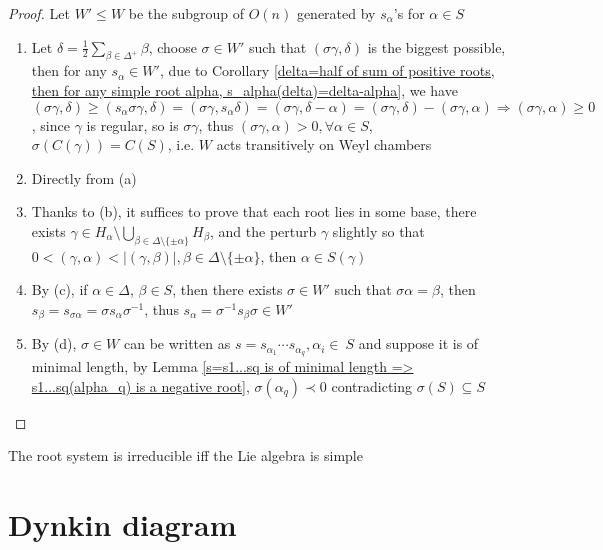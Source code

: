 \documentclass[main]{subfiles}
\begin{document}
\begin{proof}
Let $W'\leq W$ be  the subgroup of $O(n)$ generated by $s_\alpha$'s for $\alpha\in S$
\begin{enumerate}[leftmargin=*,label=\textbf{(\alph*)}]
\item Let $\delta=\displaystyle\frac{1}{2}\sum_{\beta\in\Delta^+}\beta$, choose $\sigma\in W'$ such that $(\sigma\gamma,\delta)$ is the biggest possible, then for any $s_\alpha\in W'$, due to Corollary \ref{delta=half of sum of positive roots, then for any simple root alpha, s_alpha(delta)=delta-alpha}, we have $(\sigma\gamma,\delta)\geq(s_\alpha\sigma\gamma,\delta)=(\sigma\gamma,s_\alpha\delta)=(\sigma\gamma,\delta-\alpha)=(\sigma\gamma,\delta)-(\sigma\gamma,\alpha)\Rightarrow(\sigma\gamma,\alpha)\geq0$, since $\gamma$ is regular, so is $\sigma\gamma$, thus $(\sigma\gamma,\alpha)>0,\forall\alpha\in S$, $\sigma(C(\gamma))=C(S)$, i.e. $W$ acts transitively on Weyl chambers
\item Directly from (a)
\item Thanks to (b), it suffices to prove that each root lies in some base, there exists $\displaystyle\gamma\in H_\alpha\setminus\bigcup_{\beta\in\Delta\setminus\{\pm\alpha\}}H_\beta$, and the perturb $\gamma$ slightly so that $0<(\gamma,\alpha)<\left|(\gamma,\beta)\right|,\beta\in\Delta\setminus\{\pm\alpha\}$, then $\alpha\in S(\gamma)$
\item By (c), if $\alpha\in\Delta$, $\beta\in S$, then there exists $\sigma\in W'$ such that $\sigma\alpha=\beta$, then $s_\beta=s_{\sigma\alpha}=\sigma s_\alpha\sigma^{-1}$, thus $s_\alpha=\sigma^{-1} s_\beta\sigma\in W'$
\item By (d), $\sigma\in W$ can be written as $s=s_{\alpha_1}\cdots s_{\alpha_q},\alpha_i\in\ S$ and suppose it is of minimal length, by Lemma \ref{s=s1...sq is of minimal length => s1...sq(alpha_q) is a negative root}, $\sigma(\alpha_q)\prec0$ contradicting $\sigma(S)\subseteq S$
\end{enumerate}
\end{proof}

\begin{proposition}
The root system is irreducible iff the Lie algebra is simple
\end{proposition}



\section{Dynkin diagram}
\end{document}
